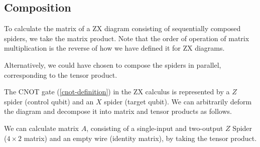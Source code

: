 
\subsection{Composition}%
\label{composition}

To calculate the matrix of a ZX diagram consisting of sequentially composed spiders, we take the matrix product. Note that the order of operation of matrix multiplication is the reverse of how we have defined it for ZX diagrams.


Alternatively, we could have chosen to compose the spiders in parallel, corresponding to the tensor product.


The CNOT gate (\ref{cnot-definition}) in the ZX calculus is represented by a $Z$ spider (control qubit) and an $X$ spider (target qubit). We can arbitrarily deform the diagram and decompose it into matrix and tensor products as follows.


We can calculate matrix $A$, consisting of a single-input and two-output $Z$ Spider ($4 \times 2$ matrix) and an empty wire (identity matrix), by taking the tensor product.


